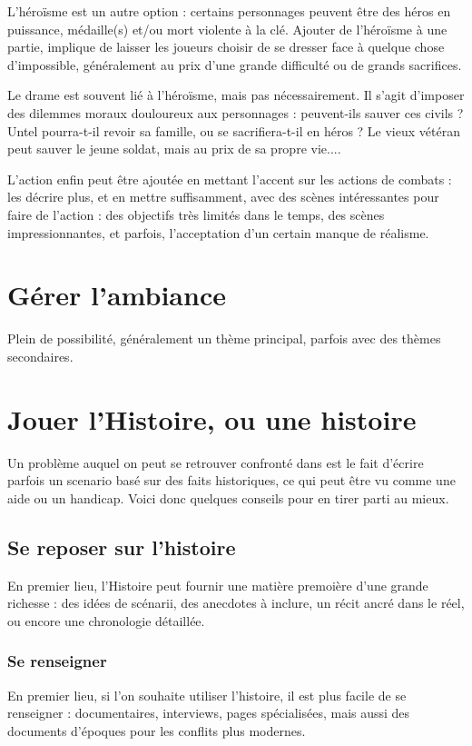 \documentclass{report}
\begin{document}
\begin{multicols}{2}
L'héroïsme est un autre option : certains personnages peuvent être des héros en puissance, médaille(s) et/ou mort violente à la clé. Ajouter de l'héroïsme à une partie, implique de laisser les joueurs choisir de se dresser face à quelque chose d'impossible, généralement au prix d'une grande difficulté ou de grands sacrifices.

Le drame est souvent lié à l'héroïsme, mais pas nécessairement. Il s'agit d'imposer des dilemmes moraux douloureux aux personnages : peuvent-ils sauver ces civils ? Untel pourra-t-il revoir sa famille, ou se sacrifiera-t-il en héros ? Le vieux vétéran peut sauver le jeune soldat, mais au prix de sa propre vie....


L'action enfin peut être ajoutée en mettant l'accent sur les actions de combats : les décrire plus, et en mettre suffisamment, avec des scènes intéressantes pour faire de l'action : des objectifs très limités dans le temps, des scènes impressionnantes, et parfois, l'acceptation d'un certain manque de réalisme.


\section{Gérer l'ambiance}
Plein de possibilité, généralement un thème principal, parfois avec des thèmes secondaires.
\section{Jouer l'Histoire, ou une histoire}
Un problème auquel on peut se retrouver confronté dans \diminutif est le fait d'écrire parfois un scenario basé sur des faits historiques, ce qui peut être vu comme une aide ou un handicap. Voici donc quelques conseils pour en tirer parti au mieux.
\subsection{Se reposer sur l'histoire}
En premier lieu, l'Histoire peut fournir une matière premoière d'une grande richesse : des idées de scénarii, des anecdotes à inclure, un récit ancré dans le réel, ou encore une chronologie détaillée.

\subsubsection{Se renseigner}
En premier lieu, si l'on souhaite utiliser l'histoire, il est plus facile de se renseigner : documentaires, interviews, pages spécialisées, mais aussi des documents d'époques pour les conflits plus modernes. 


\end{multicols}
\end{document}
